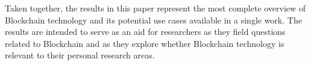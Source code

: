 
Taken together, the results in this paper represent the most complete overview 
of Blockchain technology and its potential use cases available in a single work.
The results are intended to serve as an aid for researchers as they field questions related to Blockchain and as they explore whether Blockchain technology is relevant to their personal research areas.

	
	
